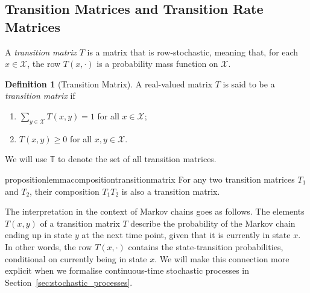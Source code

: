 \documentclass[10pt,a4paper]{paper}
\theoremstyle{definition}
\newtheorem{proposition}[theorem]{Proposition}
\newtheorem{definition}{Definition}
\newcommand{\states}{\mathcal{X}}
\begin{document}
\subsection{Transition Matrices and Transition Rate Matrices}\label{sec:trans_rate_matrices}

 
A \emph{transition matrix} $T$ is a matrix that is row-stochastic, meaning that, for each $x\in\states$, the row $T(x,\cdot)$ is a probability mass function on $\states$.
\begin{definition}[Transition Matrix]\label{def:stoch_matrix}
A real-valued matrix $T$ is said to be a \emph{transition matrix} if
\vspace{5pt}
\begin{enumerate}[label=T\arabic*:,ref=T\arabic*]
\item\label{def:T:sumone}
$\sum_{y\in\states}T(x,y)=1$ for all $x\in\states$;\label{def:trans_matrix_is_stochastic}
\item\label{def:T:nonneg}
$T(x,y)\geq0$ for all $x,y\in\states$.
\end{enumerate}
\vspace{5pt}
\noindent We will use $\mathbb{T}$ to denote the set of all transition matrices.
\end{definition}

\begin{restatable}{proposition}{lemmacompositiontransitionmatrix}\label{lemma:compositiontransitionmatrix}
For any two transition matrices $T_1$ and $T_2$, their composition $T_1T_2$ is also a transition matrix.
\end{restatable}

The interpretation in the context of Markov chains goes as follows. The elements $T(x,y)$ of a transition matrix $T$ describe the probability of the Markov chain ending up in state $y$ at the next time point, given that it is currently in state $x$. In other words, the row $T(x,\cdot)$ contains the state-transition probabilities, conditional on currently being in state $x$. We will make this connection more explicit when we formalise continuous-time stochastic processes in Section~\ref{sec:stochastic_processes}.
\end{document}

